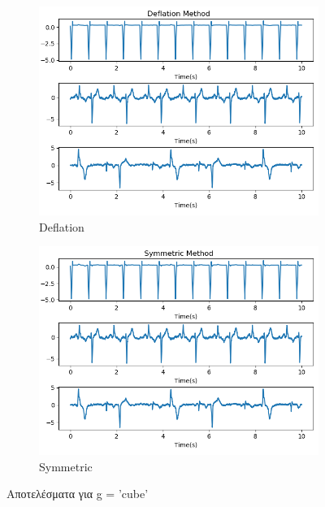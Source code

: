 \begin{figure}[H]
    \centering
    \begin{subfigure}{0.48 \textwidth}
        \centering
       \includegraphics[width=\textwidth]{biosignals/aami_cube_def.png} \en
        \caption{Deflation} \gr
        \label{fig:5.16a}
    \end{subfigure}
    \hfill
    \begin{subfigure}{0.48 \textwidth}
        \centering
       \includegraphics[width=\textwidth]{biosignals/aami_cube_sym.png} \en
        \en
        \caption{Symmetric} \gr
        \label{fig:5.16b}
    \end{subfigure}
    \gr
    \caption{Αποτελέσματα για \en g = 'cube' \gr}
\end{figure}
